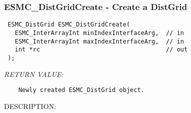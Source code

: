  
\setlength{\oldparskip}{\parskip}
\setlength{\parskip}{1.5ex}
\setlength{\oldparindent}{\parindent}
\setlength{\parindent}{0pt}
\setlength{\oldbaselineskip}{\baselineskip}
\setlength{\baselineskip}{11pt}
 
\def\bv{\begin{verbatim}}
\def\ev{\end{verbatim}}
\def\be{\begin{equation}}
\def\ee{\end{equation}}
\def\bea{\begin{eqnarray}}
\def\eea{\end{eqnarray}}
\def\bi{\begin{itemize}}
\def\ei{\end{itemize}}
\def\bn{\begin{enumerate}}
\def\en{\end{enumerate}}
\def\bd{\begin{description}}
\def\ed{\end{description}}
\def\({\left (}
\def\){\right )}
\def\[{\left [}
\def\]{\right ]}
\def\<{\left  \langle}
\def\>{\right \rangle}
\def\cI{{\cal I}}
\def\diag{\mathop{\rm diag}}
\def\tr{\mathop{\rm tr}}


 
\subsubsection [ESMC\_DistGridCreate] {ESMC\_DistGridCreate - Create a DistGrid}


  
\begin{verbatim} ESMC_DistGrid ESMC_DistGridCreate(
   ESMC_InterArrayInt minIndexInterfaceArg,  // in
   ESMC_InterArrayInt maxIndexInterfaceArg,  // in
   int *rc                                   // out
 );\end{verbatim}{\em RETURN VALUE:}
\begin{verbatim}    Newly created ESMC_DistGrid object.\end{verbatim}
{\sf DESCRIPTION:\\ }


